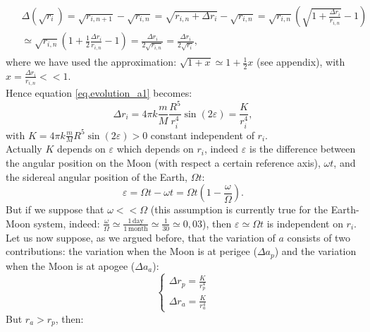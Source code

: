 \documentclass[11pt, oneside,reqno]{amsart}
\begin{document}
\begin{align}
    \label{eq.derivative}
    \begin{aligned}
        &\Delta\left(\sqrt{r_i}\right) = 
        \sqrt{r_{i, n+1}}-\sqrt{r_{i,n}} = \sqrt{r_{i,n}+\Delta r_i}-\sqrt{r_{i,n}} = \sqrt{r_{i,n}} \left( \sqrt{1+ \frac{\Delta r_i}{r_{i,n}}} - 1 \right) \\
        &\simeq \sqrt{r_{i,n}} \left( 1+ \frac{1}{2}\frac{\Delta r_i}{r_{i,n}} - 1 \right) = \frac{\Delta r_i}{2\sqrt{r_{i,n}}} = \frac{\Delta r_i}{2\sqrt{r_i}},
    \end{aligned}
\end{align}
where we have used the approximation: $\sqrt{1+x}\simeq 1+\frac{1}{2}x$ (see appendix), with $x=\frac{\Delta r_i}{r_{i,n}} << 1$.\\
Hence equation \eqref{eq.evolution_a1} becomes:
\begin{equation}\label{eq.evolution_a2}
    \Delta r_i = 4\pi k \frac{m}{M} \frac{R^5}{r_i^4} \sin(2\varepsilon) = \frac{K}{r_i^4},
\end{equation} 
with $K= 4\pi k \frac{m}{M} R^5 \sin(2\varepsilon) > 0$ constant independent of $r_i$.\\
Actually $K$ depends on $\varepsilon$ which depends on $r_i$, indeed $\varepsilon$ is the difference between the angular position on the Moon (with respect a certain reference axis), $ \omega t $, and the sidereal angular position of the Earth, $\Omega t$:
\begin{equation}\label{eq_approxepsilon}
    \varepsilon = \Omega t - \omega t = \Omega t ( 1 - \frac{\omega}{\Omega}).  
\end{equation}
But if we suppose that $\omega << \Omega$ (this assumption is currently true for the Earth-Moon system, indeed: $\frac{\omega}{\Omega} \simeq \frac{1\,\text{day}}{1\,\text{month}} \simeq \frac{1}{30} \simeq 0,03$), then $\varepsilon \simeq \Omega t$ is independent on $r_i$.\\
Let us now suppose, as we argued before, that the variation of $a$ consists of two contributions: the variation when the Moon is at perigee ($\Delta a_p$) and the variation when the Moon is at apogee ($\Delta a_a$):
\begin{equation}\label{eq.variation_adouble}
\begin{cases}
    \Delta r_p = \frac{K}{r_p^4}\\
    \Delta r_a = \frac{K}{r_a^4}
\end{cases}
\end{equation}
But $r_a>r_p$, then: 
\end{document}
